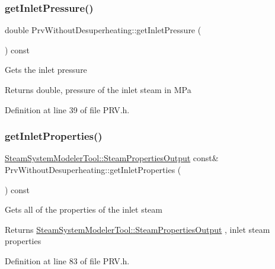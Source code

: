 \subsubsection{\texorpdfstring{get\+Inlet\+Pressure()}{getInletPressure()}}
{\footnotesize\ttfamily double Prv\+Without\+Desuperheating\+::get\+Inlet\+Pressure (\begin{DoxyParamCaption}{ }\end{DoxyParamCaption}) const\hspace{0.3cm}{\ttfamily [inline]}}

Gets the inlet pressure

\begin{DoxyReturn}{Returns}
double, pressure of the inlet steam in M\+Pa 
\end{DoxyReturn}


Definition at line 39 of file P\+R\+V.\+h.

\mbox{\label{class_prv_without_desuperheating_aefb61f9d9dd99216459f6948308d11e9}} 
\subsubsection{\texorpdfstring{get\+Inlet\+Properties()}{getInletProperties()}}
{\footnotesize\ttfamily \hyperlink{struct_steam_system_modeler_tool_1_1_steam_properties_output}{Steam\+System\+Modeler\+Tool\+::\+Steam\+Properties\+Output} const\& Prv\+Without\+Desuperheating\+::get\+Inlet\+Properties (\begin{DoxyParamCaption}{ }\end{DoxyParamCaption}) const\hspace{0.3cm}{\ttfamily [inline]}}

Gets all of the properties of the inlet steam \begin{DoxyReturn}{Returns}
\hyperlink{struct_steam_system_modeler_tool_1_1_steam_properties_output}{Steam\+System\+Modeler\+Tool\+::\+Steam\+Properties\+Output} , inlet steam properties 
\end{DoxyReturn}


Definition at line 83 of file P\+R\+V.\+h.

\mbox{\label{class_prv_without_desuperheating_ab13245e86b90832de0b4190163236551}} 
